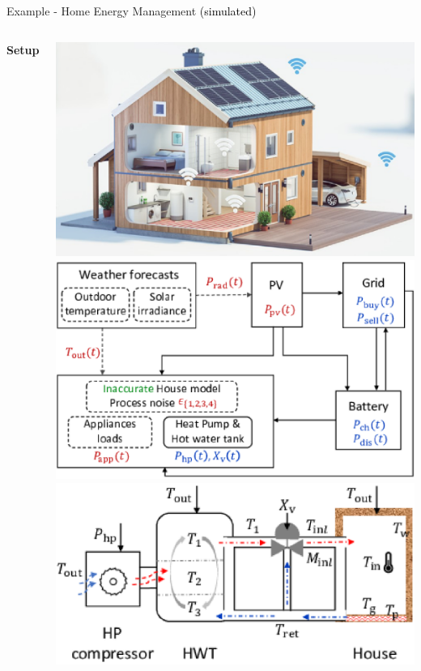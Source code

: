 \documentclass[lecture]{beamer}
\begin{document}
\begin{frame}{\normalsize Example - Home Energy Management {\textcolor{black}{\scriptsize(simulated)}}}
\footnotesize
\begin{columns}
\textbf{Setup}
\vspace{-.2cm}
\begin{block}{} 
\includegraphics[width=1\textwidth,clip]{Figures/SmartHouse.eps}\\
\vspace{.25cm}
\includegraphics[width=1\textwidth,clip]{Illustration/HomeManagement/HEMS.eps}\\
\vspace{.25cm}
\includegraphics[width=1\textwidth,clip]{Illustration/HomeManagement/HP_HWT.eps}
\end{block} 


\end{columns}
\end{frame}
\end{document}
